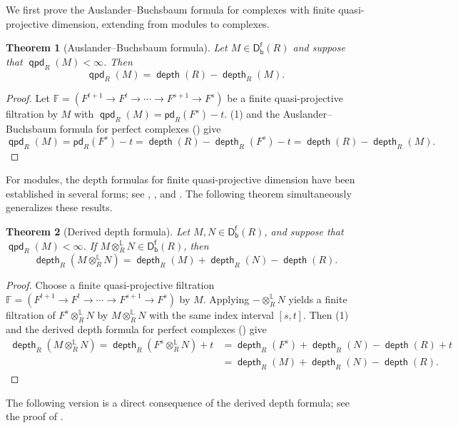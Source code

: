 \documentclass[10pt, a4paper,reqno]{amsart}
\newtheorem{thm}{Theorem}[section]
\theoremstyle{definition}
\theoremstyle{remark}
\numberwithin{equation}{thm}
\def\FF{\mathbb{F}}
\def\depth{\operatorname{\mathsf{depth}}}
\def\Dfb{\mathsf{D^f_b}}
\def\ltensor{\otimes^{\mathbb{L}}}
\def\pd{\mathsf{pd}}
\def\qpd{\operatorname{\mathsf{qpd}}}
\begin{document}
We first prove the Auslander--Buchsbaum formula for complexes with finite quasi-projective dimension, extending \cite[Theorem 4.4]{GJT} from modules to complexes.

\begin{thm}[Auslander--Buchsbaum formula]\label{AB}
Let $M\in\Dfb(R)$ and suppose that $\qpd_R(M)<\infty$.
Then
\[
\qpd_R(M)=\depth(R)-\depth_R(M).
\]
\end{thm}

\begin{proof}
Let $\FF=(F^{t+1}\to F^t\to\cdots\to F^{s+1}\to F^s)$ be a finite quasi-projective filtration by $M$ with $\qpd_R(M) = \pd_R(F^s) -t$.
(1) and the Auslander--Buchsbaum formula for perfect complexes (\cite[Corollary 16.4.2]{CFH}) give
\[
\qpd_R(M) = \pd_R(F^s)-t=\depth (R)-\depth_R(F^s)-t=\depth (R)-\depth_R(M).
\]
\end{proof}

For modules, the depth formulas for finite quasi-projective dimension have been established in several forms; see \cite[Theorem~4.11]{GJT}, \cite[Theorem~3.7]{JPMMR}, and \cite[Theorem~3.5]{FL}.
The following theorem simultaneously generalizes these results.

\begin{thm}[Derived depth formula]\label{DDF}
Let $M,N\in\Dfb(R)$, and suppose that $\qpd_R(M)<\infty$.
If $M\ltensor_RN\in\Dfb(R)$, then
\[
\depth_R(M\ltensor_RN)=\depth_R(M)+\depth_R(N)-\depth (R).
\]
\end{thm}

\begin{proof}
Choose a finite quasi-projective filtration $\FF=(F^{t+1}\to F^t\to\cdots\to F^{s+1}\to F^s)$ by $M$.
Applying $-\ltensor_RN$ yields a finite filtration of $F^s\ltensor_RN$ by $M\ltensor_RN$ with the same index interval $[s,t]$.
Then (1) and the derived depth formula for perfect complexes (\cite[Theorem 16.4.3]{CFH}) give
\begin{align*}
\depth_R(M\ltensor_RN) = \depth_R(F^s\ltensor_RN) + t &= \depth_R(F^s) + \depth_R(N) - \depth(R) + t \\
&= \depth_R(M) + \depth_R(N) - \depth(R).
\end{align*}
\end{proof}

The following version is a direct consequence of the derived depth formula; see the proof of \cite[Corollary 2.4]{Iye}.
\end{document}
